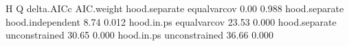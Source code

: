 \begin{Schunk}
\begin{Soutput}
             H                Q delta.AICc AIC.weight
 hood.separate      equalvarcov       0.00      0.988
 hood.separate hood.independent       8.74      0.012
    hood.in.ps      equalvarcov      23.53      0.000
 hood.separate    unconstrained      30.65      0.000
    hood.in.ps    unconstrained      36.66      0.000
\end{Soutput}
\end{Schunk}
